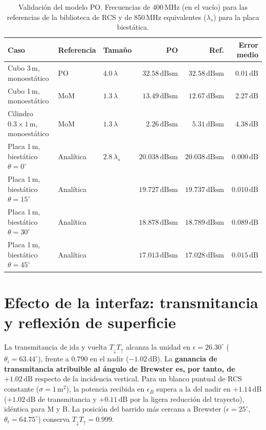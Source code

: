 \documentclass[11pt,a4paper]{report}
\newcommand{\dB}{\,\mathrm{dB}}
\newcommand{\dBsm}{\,\mathrm{dBsm}}
\begin{document}
\begin{table}[H]
\centering
\caption{Validación del modelo PO. Frecuencias de 400\,MHz (en el vacío)
para las referencias de la biblioteca de RCS y de 850\,MHz equivalentes
($\lambda_s$) para la placa biestática.}
\label{tab:validacion}
\small
\setlength{\tabcolsep}{4pt}
\begin{tabular}{@{}lllrrr@{}}
\toprule
\textbf{Caso} & \textbf{Referencia} & \textbf{Tamaño} & \textbf{PO} & \textbf{Ref.} & \textbf{Error medio} \\
\midrule
Cubo 3\,m, monoestático & PO & $4.0\,\lambda$ & $32.58\dBsm$ & $32.58\dBsm$ & $0.01\dB$ \\
Cubo 1\,m, monoestático & MoM & $1.3\,\lambda$ & $13.49\dBsm$ & $12.67\dBsm$ & $2.27\dB$ \\
Cilindro $0.3\times1$\,m, monoestático & MoM & $1.3\,\lambda$ & $2.26\dBsm$ & $5.31\dBsm$ & $4.38\dB$ \\
\midrule
Placa 1\,m, biestático $\theta=0^\circ$ & Analítica & $2.8\,\lambda_s$ & $20.038\dBsm$ & $20.038\dBsm$ & $0.000\dB$ \\
Placa 1\,m, biestático $\theta=15^\circ$ & Analítica & & $19.727\dBsm$ & $19.737\dBsm$ & $0.010\dB$ \\
Placa 1\,m, biestático $\theta=30^\circ$ & Analítica & & $18.878\dBsm$ & $18.789\dBsm$ & $0.089\dB$ \\
Placa 1\,m, biestático $\theta=45^\circ$ & Analítica & & $17.013\dBsm$ & $17.028\dBsm$ & $0.015\dB$ \\
\bottomrule
\end{tabular}
\end{table}

\section{Efecto de la interfaz: transmitancia y reflexión de superficie}
\label{sec:res_fresnel}

La transmitancia de ida y vuelta $T_\downarrow T_\uparrow$ alcanza la unidad
en $\epsilon=26.30^\circ$ ($\theta_i=63.44^\circ$), frente a $0.790$ en el
nadir ($-1.02\dB$). La \textbf{ganancia de transmitancia atribuible al
ángulo de Brewster es, por tanto, de $+1.02\dB$} respecto de la incidencia
vertical. Para un blanco puntual de RCS constante ($\sigma=1\,\mathrm{m}^2$),
la potencia recibida en $\epsilon_B$ supera a la del nadir en $+1.14\dB$
($+1.02\dB$ de transmitancia y $+0.11\dB$ por la ligera reducción del
trayecto), idéntica para M y B. La posición del barrido más cercana a
Brewster ($\epsilon=25^\circ$, $\theta_i=64.75^\circ$) conserva
$T_\downarrow T_\uparrow=0.999$.
\end{document}
